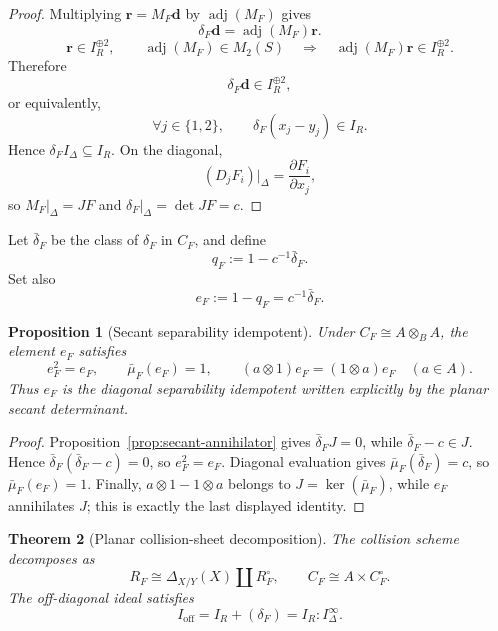 \documentclass[11pt]{article}
\newtheorem{theorem}{Theorem}[section]
\newtheorem{proposition}[theorem]{Proposition}
\theoremstyle{remark}
\theoremstyle{definition}
\begin{document}
\begin{proof}
Multiplying \(\mathbf r=M_F\mathbf d\) by
\(\operatorname{adj}(M_F)\) gives
\[
  \delta_F\mathbf d=\operatorname{adj}(M_F)\mathbf r.
\]
\[
  \mathbf r\in I_R^{\oplus2},
  \qquad
  \operatorname{adj}(M_F)\in M_2(S)
  \quad\Longrightarrow\quad
  \operatorname{adj}(M_F)\mathbf r\in I_R^{\oplus2}.
\]
Therefore
\[
  \delta_F\mathbf d\in I_R^{\oplus2},
\]
or equivalently,
\[
  \forall j\in\{1,2\},
  \qquad
  \delta_F(x_j-y_j)\in I_R.
\]
Hence \(\delta_FI_\Delta\subseteq I_R\).  On the diagonal,
\[
  (D_jF_i)|_\Delta=\frac{\partial F_i}{\partial x_j},
\]
so \(M_F|_\Delta=JF\) and
\(\delta_F|_\Delta=\det JF=c\).
\end{proof}

Let \(\bar\delta_F\) be the class of \(\delta_F\) in \(C_F\), and define
\[
  q_F:=1-c^{-1}\bar\delta_F.
\]
Set also
\[
  e_F:=1-q_F=c^{-1}\bar\delta_F.
\]

\begin{proposition}[Secant separability idempotent]
\label{prop:secant-separability-idempotent}
Under \(C_F\cong A\otimes_BA\), the element \(e_F\) satisfies
\[
  e_F^2=e_F,
  \qquad
  \bar\mu_F(e_F)=1,
  \qquad
  (a\otimes1)e_F=(1\otimes a)e_F
  \quad(a\in A).
\]
Thus \(e_F\) is the diagonal separability idempotent written explicitly by
the planar secant determinant.
\end{proposition}

\begin{proof}
Proposition~\ref{prop:secant-annihilator} gives
\(\bar\delta_FJ=0\), while
\(\bar\delta_F-c\in J\).  Hence
\(\bar\delta_F(\bar\delta_F-c)=0\), so
\(e_F^2=e_F\).
Diagonal evaluation gives
\(\bar\mu_F(\bar\delta_F)=c\), so
\(\bar\mu_F(e_F)=1\).  Finally,
\(a\otimes1-1\otimes a\) belongs to
\(J=\ker(\bar\mu_F)\), while \(e_F\) annihilates \(J\); this is exactly the
last displayed identity.
\end{proof}

\begin{theorem}[Planar collision-sheet decomposition]
\label{thm:collision-sheet-decomposition}
The collision scheme decomposes as
\[
  R_F\cong\Delta_{X/Y}(X)\amalg R_F^\circ,
  \qquad
  C_F\cong A\times C_F^\circ.
\]
The off-diagonal ideal satisfies
\[
  I_{\mathrm{off}}
  =
  I_R+(\delta_F)
  =
  I_R:I_\Delta^\infty.
\]
\end{theorem}
\end{document}
